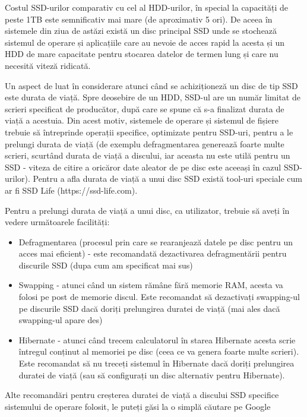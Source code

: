 Costul SSD-urilor comparativ cu cel al HDD-urilor, în special la capacități de
peste 1TB este semnificativ mai mare (de aproximativ 5 ori). De aceea în
sistemele din ziua de astăzi există un disc principal SSD unde se stochează
sistemul de operare și aplicațiile care au nevoie de acces rapid la acesta și un
HDD de mare capacitate pentru stocarea datelor de termen lung și care nu
necesită viteză ridicată.

Un aspect de luat în considerare atunci când se achiziționeză un disc de tip SSD
este durata de viață. Spre deosebire de un HDD, SSD-ul are un număr limitat de
scrieri specificat de producător, după care se spune că s-a finalizat durata de
viață a acestuia. Din acest motiv, sistemele de operare și sistemul de fișiere
trebuie să întreprinde operații specifice, optimizate pentru SSD-uri, pentru a
le prelungi durata de viață (de exemplu defragmentarea generează foarte multe
scrieri, scurtând durata de viață a discului, iar aceasta nu este utilă pentru
un SSD - viteza de citire a oricăror date aleator de pe disc este aceeași în
cazul SSD-urilor). Pentru a afla durata de viață a unui disc SSD există tool-uri
speciale cum ar fi SSD Life (https://ssd-life.com).


Pentru a prelungi durata de viață a unui disc, ca utilizator, trebuie să aveți
în vedere următoarele facilități:

\begin{itemize}
	\item Defragmentarea (procesul prin care se rearanjează datele pe disc
		pentru un acces mai eficient) - este recomandată dezactivarea
		defragmentării pentru discurile SSD (dupa cum am specificat mai
		sus)
	\item Swapping - atunci când un sistem rămâne fără memorie RAM, acesta
		va folosi pe post de memorie discul. Este recomandat să
		dezactivați swapping-ul pe discurile SSD dacă doriți prelungirea
		duratei de viață (mai ales dacă swapping-ul apare des)
	\item Hibernate - atunci când trecem calculatorul în starea Hibernate
		acesta scrie întregul conținut al memoriei pe disc (ceea ce va
		genera foarte multe scrieri). Este recomandat să nu treceți
		sistemul în Hibernate dacă doriți prelungirea duratei de viață
		(sau să configurați un disc alternativ pentru Hibernate).
\end{itemize}

Alte recomandări pentru creșterea duratei de viață a discului SSD specifice
sistemului de operare folosit, le puteți găsi la o simplă căutare pe Google


